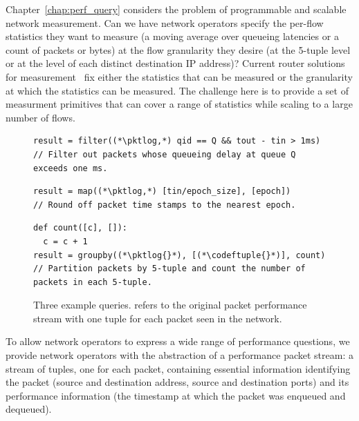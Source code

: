 Chapter~\ref{chap:perf_query} considers the problem of programmable and
scalable network measurement. Can we have network operators specify the
per-flow statistics they want to measure (\eg a moving average over queueing
latencies or a count of packets or bytes) at the flow granularity they desire
(\eg at the 5-tuple level or at the level of each distinct destination IP
address)? Current router solutions for measurement~\cite{netflow, tetration}
fix either the statistics that can be measured or the granularity at which the
statistics can be measured. The challenge here is to provide a set of
measurment primitives that can cover a range of statistics while scaling to a
large number of flows.

\begin{figure}
\begin{minipage}[!h]{\textwidth}
\centering
\begin{lstlisting}
result = filter((*\pktlog,*) qid == Q && tout - tin > 1ms)
// Filter out packets whose queueing delay at queue Q exceeds one ms.
\end{lstlisting}
\end{minipage}

\begin{minipage}[!h]{\textwidth}
\centering
\begin{lstlisting}
result = map((*\pktlog,*) [tin/epoch_size], [epoch])
// Round off packet time stamps to the nearest epoch.
\end{lstlisting}
\end{minipage}

\begin{minipage}[!h]{\textwidth}
\begin{lstlisting}
def count([c], []):
  c = c + 1
result = groupby((*\pktlog{}*), [(*\codeftuple{}*)], count)
// Partition packets by 5-tuple and count the number of packets in each 5-tuple.
\end{lstlisting}
\end{minipage}
\caption{Three example \TheSystem queries. {\ct \pktlog{}} refers to the
original packet performance stream with one tuple for each packet seen in the
network.}
\label{fig:example_queries}
\end{figure}

 To allow network operators to express a wide range of
performance questions, we provide network operators with the abstraction of a
performance packet stream: a stream of tuples, one for each packet, containing
essential information identifying the packet (source and destination address,
source and destination ports) and its performance information (the timestamp at
which the packet was enqueued and dequeued).

